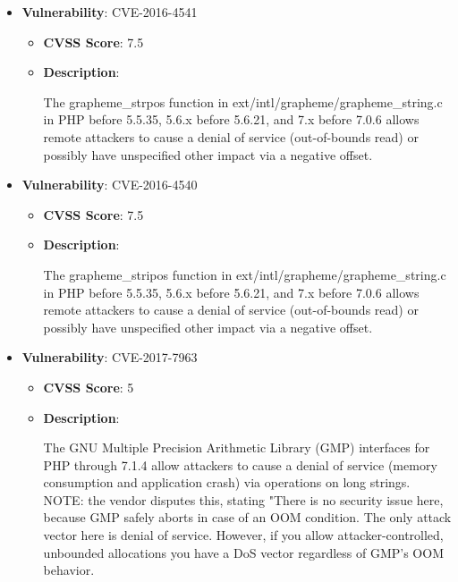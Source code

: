 \documentclass{article}
\begin{document}
\begin{itemize}
        \item \textbf{Vulnerability}: CVE-2016-4541
        \begin{itemize}
            \item \textbf{CVSS Score}:  7.5 
            \item \textbf{Description}:
            \parbox[t]{0.9\linewidth}{
                \ttfamily The grapheme\_strpos function in ext/intl/grapheme/grapheme\_string.c in PHP before 5.5.35, 5.6.x before 5.6.21, and 7.x before 7.0.6 allows remote attackers to cause a denial of service (out-of-bounds read) or possibly have unspecified other impact via a negative offset.
            }
        \end{itemize}
    
        \item \textbf{Vulnerability}: CVE-2016-4540
        \begin{itemize}
            \item \textbf{CVSS Score}:  7.5 
            \item \textbf{Description}:
            \parbox[t]{0.9\linewidth}{
                \ttfamily The grapheme\_stripos function in ext/intl/grapheme/grapheme\_string.c in PHP before 5.5.35, 5.6.x before 5.6.21, and 7.x before 7.0.6 allows remote attackers to cause a denial of service (out-of-bounds read) or possibly have unspecified other impact via a negative offset.
            }
        \end{itemize}
    
        \item \textbf{Vulnerability}: CVE-2017-7963
        \begin{itemize}
            \item \textbf{CVSS Score}:  5 
            \item \textbf{Description}:
            \parbox[t]{0.9\linewidth}{
                \ttfamily The GNU Multiple Precision Arithmetic Library (GMP) interfaces for PHP through 7.1.4 allow attackers to cause a denial of service (memory consumption and application crash) via operations on long strings. NOTE: the vendor disputes this, stating "There is no security issue here, because GMP safely aborts in case of an OOM condition. The only attack vector here is denial of service. However, if you allow attacker-controlled, unbounded allocations you have a DoS vector regardless of GMP's OOM behavior.
            }
        \end{itemize}
    

\end{itemize}
\end{document}
